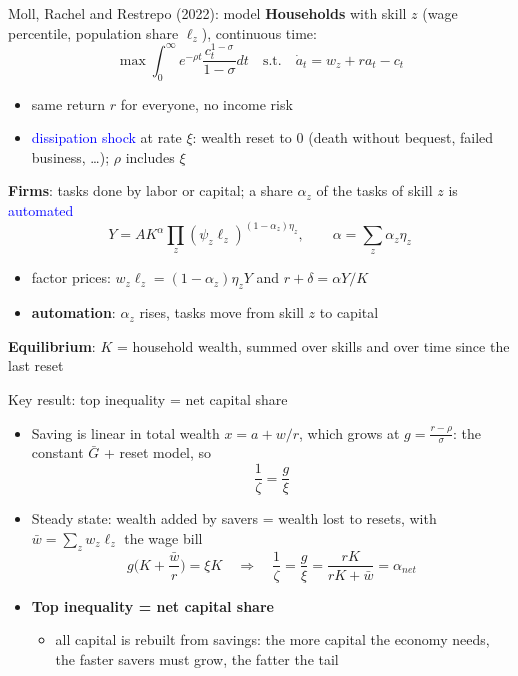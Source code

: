 \documentclass[10pt,english,10pt,handout]{beamer}
\begin{document}
\begin{frame}{Moll, Rachel and Restrepo (2022): model}
\textbf{Households} with skill $z$ (wage percentile, population share $\ell_{z}$), continuous time:
\[
\max\int_{0}^{\infty}e^{-\rho t}\frac{c_{t}^{1-\sigma}}{1-\sigma}dt\quad\text{s.t.}\quad\dot{a}_{t}=w_{z}+ra_{t}-c_{t}
\]
\vspace{-4mm}
\begin{itemize}
\item same return $r$ for everyone, no income risk
\item \textcolor{blue}{dissipation shock} at rate $\xi$: wealth reset to 0 (death without bequest, failed business, \ldots); $\rho$ includes $\xi$
\end{itemize}
\textbf{Firms}: tasks done by labor or capital; a share $\alpha_{z}$ of the tasks of skill $z$ is \textcolor{blue}{automated}
\[
Y=AK^{\alpha}\prod_{z}(\psi_{z}\ell_{z})^{(1-\alpha_{z})\eta_{z}},\qquad\alpha=\sum_{z}\alpha_{z}\eta_{z}
\]
\vspace{-4mm}
\begin{itemize}
\item factor prices: $w_{z}\ell_{z}=(1-\alpha_{z})\eta_{z}Y$ and $r+\delta=\alpha Y/K$
\item \textbf{automation}: $\alpha_{z}$ rises, tasks move from skill $z$ to capital
\end{itemize}
\textbf{Equilibrium}: $K$ = household wealth, summed over skills and over time since the last reset
\end{frame}

\begin{frame}{Key result: top inequality = net capital share}
\begin{itemize}
\item Saving is linear in total wealth $x=a+w/r$, which grows at $g=\frac{r-\rho}{\sigma}$: the constant $\bar{G}$ + reset model, so
\[
\frac{1}{\zeta}=\frac{g}{\xi}
\]
\item Steady state: wealth added by savers = wealth lost to resets, with $\bar{w}=\sum_{z}w_{z}\ell_{z}$ the wage bill
\[
g\Big(K+\frac{\bar{w}}{r}\Big)=\xi K\quad\Rightarrow\quad\frac{1}{\zeta}=\frac{g}{\xi}=\frac{rK}{rK+\bar{w}}=\alpha_{net}
\]
\item \textbf{Top inequality = net capital share}
\begin{itemize}
\item all capital is rebuilt from savings: the more capital the economy needs, the faster savers must grow, the fatter the tail
\end{itemize}
\end{itemize}
\end{frame}
\end{document}
